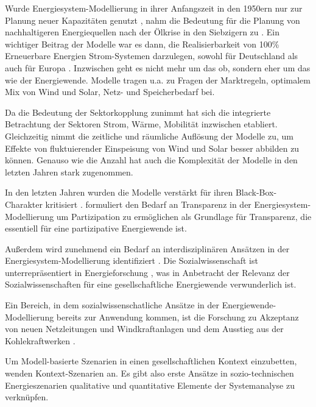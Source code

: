 \documentclass[a4paper,11pt,twoside]{scrartcl}
\begin{document}
Wurde Energiesystem-Modellierung in ihrer Anfangszeit in den 1950ern nur zur Planung neuer Kapazitäten genutzt \cite{Kagiannas2004}, nahm die Bedeutung für die Planung von nachhaltigeren Energiequellen nach der Ölkrise in den Siebzigern zu \cite{Wei2006}. Ein wichtiger Beitrag der Modelle war es dann, die Realisierbarkeit von 100\% Erneuerbare Energien Strom-Systemen darzulegen, sowohl für Deutschland \cite{SRU2011} als auch für Europa \cite{Hohmeyer2015}. Inzwischen geht es nicht mehr um das ob, sondern eher um das wie der Energiewende. Modelle tragen u.a. zu Fragen der Marktregeln, optimalem Mix von Wind und Solar, Netz- und Speicherbedarf bei.  

Da die Bedeutung der Sektorkopplung zunimmt \cite{Quaschning2016} hat sich die integrierte Betrachtung der Sektoren Strom, Wärme, Mobilität inzwischen etabliert. Gleichzeitig nimmt die zeitliche und räumliche Auflösung der Modelle zu, um Effekte von fluktuierender Einspeisung von Wind und Solar besser abbilden zu können. Genauso wie die Anzahl hat auch die Komplexität der Modelle in den letzten Jahren stark zugenommen.

In den letzten Jahren wurden die Modelle verstärkt für ihren Black-Box-Charakter kritisiert \cite{Pfenninger2017, Pfenninger2017b,Cao2016}. \cite{Wiese2015} formuliert den Bedarf an Transparenz in der Energiesystem-Modellierung um Partizipation zu ermöglichen \cite{Wiese2014} als Grundlage für Transparenz, die essentiell für eine partizipative Energiewende ist.

Außerdem wird zunehmend ein Bedarf an interdisziplinären Ansätzen in der Energiesystem-Modellierung identifiziert \cite{Wiese2018,Pfenninger2014,Schuitema2017}. Die Sozialwissenschaft ist unterrepräsentiert in Energieforschung \cite{Sovacool2014}, was in Anbetracht der Relevanz der Sozialwissenschaften für eine gesellschaftliche Energiewende \cite{Sovacool2015} verwunderlich ist.

Ein Bereich, in dem sozialwissenschatliche Ansätze in der Energiewende-Modellierung bereits zur Anwendung kommen, ist die Forschung zu Akzeptanz von neuen Netzleitungen und Windkraftanlagen \cite{vernetzen2016} und dem Ausstieg aus der Kohlekraftwerken \cite{Heinrichs2017}.

Um Modell-basierte Szenarien in einen gesellschaftlichen Kontext einzubetten, wenden \cite{WEIMERJEHLE2016} Kontext-Szenarien \cite{WEIMERJEHLE2006} an. Es gibt also erste Ansätze in  sozio-technischen Energieszenarien qualitative und quantitative Elemente der Systemanalyse zu verknüpfen.
\end{document}
